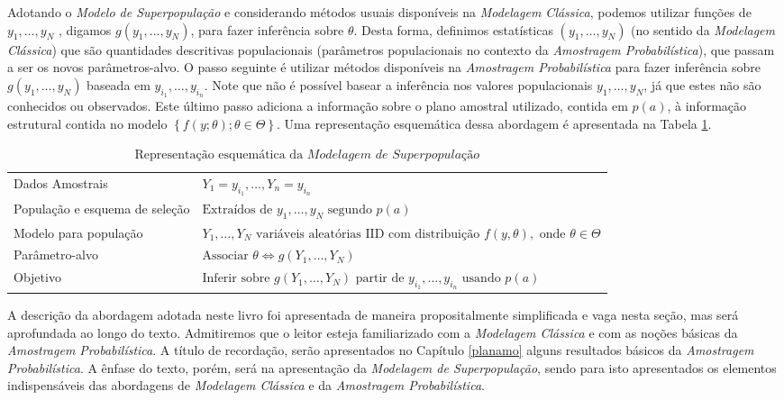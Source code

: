 \documentclass[
  12pt,
  brazilian,
]{book}
\theoremstyle{definition}
\theoremstyle{definition}
\theoremstyle{definition}
\theoremstyle{definition}
\theoremstyle{remark}
\begin{document}
Adotando o \emph{Modelo de Superpopulação} e considerando métodos usuais disponíveis
na \emph{Modelagem Clássica}, podemos utilizar funções de \(y_{1}, \ldots ,y_{N}\) ,
digamos \(g( y_{1}, \ldots , y_{N})\), para fazer inferência sobre \(\theta\). Desta
forma, definimos estatísticas \(\left( y_{1},\ldots ,y_{N}\right)\) (no sentido da
\emph{Modelagem Clássica}) que são quantidades descritivas populacionais (parâmetros
populacionais no contexto da \emph{Amostragem Probabilística}), que passam a ser os
novos parâmetros-alvo. O passo seguinte é utilizar métodos disponíveis na
\emph{Amostragem Probabilística} para fazer inferência sobre
\(g\left( y_{1}, \ldots , y_{N}\right)\) baseada em \(y_{i_1},\ldots ,y_{i_n}\).
Note que não é possível basear a inferência nos valores populacionais
\(y_{1}, \ldots , y_{N}\), já que estes não são conhecidos ou observados. Este
último passo adiciona a informação sobre o plano amostral utilizado, contida em
\(p(a)\), à informação estrutural contida no modelo
\(\left\{ f\left( y; \theta \right) ;\theta \in \Theta\right\}\). Uma
representação esquemática dessa abordagem é apresentada na Tabela
\ref{tab:modelsuperpop}.

\begin{table}[H]

\caption{\label{tab:modelsuperpop}$\text{Representação esquemática da } \textit{Modelagem de Superpopulação}$}
\centering
\begin{tabular}[t]{>{\raggedright\arraybackslash}p{5cm}l}
\toprule
Dados Amostrais & $Y_1=y_{i_1},\ldots,Y_n=y_{i_n}$\\
População e esquema de seleção & $\text{Extraídos de } y_1,\dots,y_N \text{ segundo } p(a)$\\
Modelo para população & $Y_1,\dots, Y_N \text{ variáveis aleatórias IID com distribuição } f(y,\theta),\text { onde } \theta \in \Theta$\\
Parâmetro-alvo & $\text{Associar } \theta\Leftrightarrow g\left (Y_{1},\ldots,Y_{N}\right)$\\
Objetivo & $\text{Inferir sobre }g\left( Y_{1}, \ldots ,Y_{N}\right)\text{ partir de }y_{i_1}, \ldots,y_{i_n} \text{ usando } p\left( a\right)$\\
\bottomrule
\end{tabular}
\end{table}

A descrição da abordagem adotada neste livro foi apresentada de maneira
propositalmente simplificada e vaga nesta seção, mas será aprofundada ao longo
do texto. Admitiremos que o leitor esteja familiarizado com a \emph{Modelagem
Clássica} e com as noções básicas da \emph{Amostragem Probabilística}. A título de
recordação, serão apresentados no Capítulo \ref{planamo} alguns resultados
básicos da \emph{Amostragem Probabilística}. A ênfase do texto, porém, será na
apresentação da \emph{Modelagem de Superpopulação}, sendo para isto apresentados os
elementos indispensáveis das abordagens de \emph{Modelagem Clássica} e da \emph{Amostragem
Probabilística}.
\end{document}
